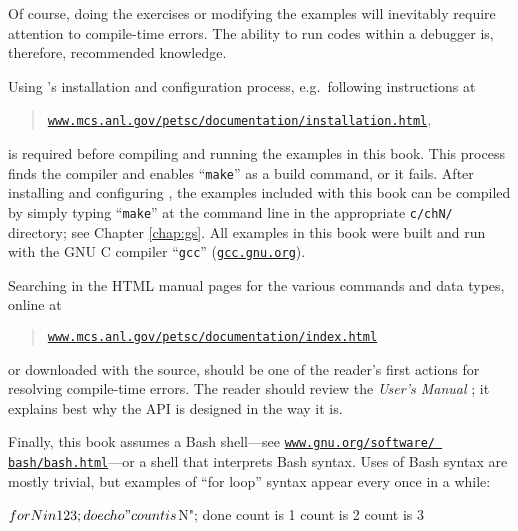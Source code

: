 Of course, doing the exercises or modifying the examples will inevitably require attention to compile-time errors.  The ability to run codes within a debugger is, therefore, recommended knowledge.

Using \PETSc's installation and configuration process, e.g.~following instructions at
\begin{quote}
\href{http://www.mcs.anl.gov/petsc/documentation/installation.html}{\texttt{www.mcs.anl.gov/petsc/documentation/installation.html}},
\end{quote}
is required before compiling and running the examples in this book.  This process finds the compiler and enables ``\texttt{make}'' as a build command, or it fails.  After installing and configuring \PETSc, the examples included with this book can be compiled by simply typing ``\texttt{make}'' at the command line in the appropriate \texttt{c/chN/} directory; see Chapter \ref{chap:gs}.  All examples in this book were built and run with the GNU C compiler ``\texttt{gcc}'' (\href{https://gcc.gnu.org/}{\texttt{gcc.gnu.org}}).

Searching in the \PETSc HTML manual pages for the various commands and data types, online at
\begin{quote}
\href{http://www.mcs.anl.gov/petsc/documentation/index.html}{\texttt{www.mcs.anl.gov/petsc/documentation/index.html}}
\end{quote}
or downloaded with the \PETSc source, should be one of the reader's first actions for resolving compile-time errors.  The reader should review the \emph{\PETSc User's Manual} \citep{petsc-user-ref}; it explains best why the API is designed in the way it is.

Finally, this book assumes a Bash shell---see  \href{https://www.gnu.org/software/bash/bash.html}{\texttt{www.gnu.org/software/ bash/bash.html}}---or a shell that interprets Bash syntax.  Uses of Bash syntax are mostly trivial, but examples of ``for loop'' syntax appear every once in a while:
\begin{cline}
$ for N in 1 2 3; do echo "count is $N"; done
count is 1
count is 2
count is 3
\end{cline}
